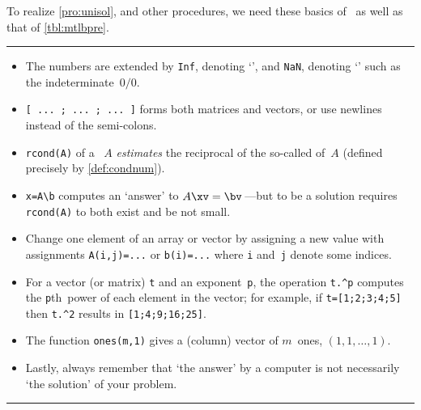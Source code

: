 \begin{table}
\caption{To realize \cref{pro:unisol}, and other procedures, we need these basics of \script\ as well as that of \cref{tbl:mtlbpre}.} \label{tbl:mtlbbasics}
\hrule\smallskip
\begin{minipage}{\linewidth}
\begin{itemize}
\item The  numbers are extended by \verb|Inf|, denoting `', and \verb|NaN|, denoting `' such as the indeterminate~\(0/0\).
\item {}\verb|[ ... ; ... ; ... ]| forms both matrices and vectors, or use newlines instead of the semi-colons.
\item {}\verb|rcond(A)|  of a ~\(A\) \emph{estimates} the reciprocal of the so-called  of~\(A\) (defined precisely by \cref{def:condnum}).
\item {}\verb|x=A\b| computes an `answer' to \(A\xv=\bv\)\,---but to be a solution requires \verb|rcond(A)| to both exist and be not small.
\item {}Change one element of an array or vector by assigning a new value with assignments \verb|A(i,j)=...| or \verb|b(i)=...| where \verb|i| and~\verb|j| denote some indices.
\item {}For a vector (or matrix) \verb|t| and an exponent~\verb|p|, the operation \verb|t.^p| computes the \verb|p|th~power of each element in the vector; for example, if \verb|t=[1;2;3;4;5]| then \verb|t.^2| results in \verb|[1;4;9;16;25]|.
\item The function \verb|ones(m,1)| gives a (column) vector of \(m\)~ones, \((1,1,\ldots,1)\).
\item Lastly, always remember that `the answer' by a computer is not necessarily `the solution' of your problem.
\end{itemize}
\end{minipage}
\smallskip\hrule
\end{table}


